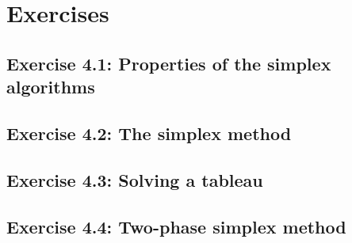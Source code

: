 \section*{Exercises}

\subsection*{Exercise 4.1: Properties of the simplex algorithms}


\subsection*{Exercise 4.2: The simplex method}


\subsection*{Exercise 4.3: Solving a tableau}


\pagebreak

\subsection*{Exercise 4.4: Two-phase simplex method}





